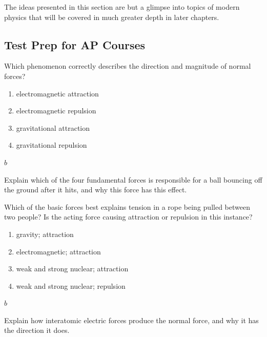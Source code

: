 \documentclass[
]{book}
\providecommand{\tightlist}{%
  \setlength{\itemsep}{0pt}\setlength{\parskip}{0pt}}
\newenvironment{ap-test-prep}{}{}
\begin{document}
The ideas presented in this section are but a glimpse into topics of
modern physics that will be covered in much greater depth in later
chapters.

\hypertarget{fs-id1546076}{}
\begin{ap-test-prep}

\hypertarget{test-prep-for-ap-courses-14}{%
\subsection{Test Prep for AP Courses}\label{test-prep-for-ap-courses-14}}

\hypertarget{fs-id1342174}{}
\leavevmode\hypertarget{fs-id895568}{}%
Which phenomenon correctly describes the direction and magnitude of
normal forces?

\begin{enumerate}
\def\labelenumi{\alph{enumi}.}
\tightlist
\item
  electromagnetic attraction
\item
  electromagnetic repulsion
\item
  gravitational attraction
\item
  gravitational repulsion
\end{enumerate}

\leavevmode\hypertarget{fs-id2173841}{}%
\(b\)

\hypertarget{fs-id1835056}{}
\leavevmode\hypertarget{fs-id1356337}{}%
Explain which of the four fundamental forces is responsible for a ball
bouncing off the ground after it hits, and why this force has this
effect.

\hypertarget{fs-id1447352}{}
\leavevmode\hypertarget{fs-id1434025}{}%
Which of the basic forces best explains tension in a rope being pulled
between two people? Is the acting force causing attraction or repulsion
in this instance?

\begin{enumerate}
\def\labelenumi{\alph{enumi}.}
\tightlist
\item
  gravity; attraction
\item
  electromagnetic; attraction
\item
  weak and strong nuclear; attraction
\item
  weak and strong nuclear; repulsion
\end{enumerate}

\leavevmode\hypertarget{fs-id1347751}{}%
\(b\)

\hypertarget{fs-id1679830}{}
\leavevmode\hypertarget{fs-id1205612}{}%
Explain how interatomic electric forces produce the normal force, and
why it has the direction it does.


\end{ap-test-prep}
\end{document}

